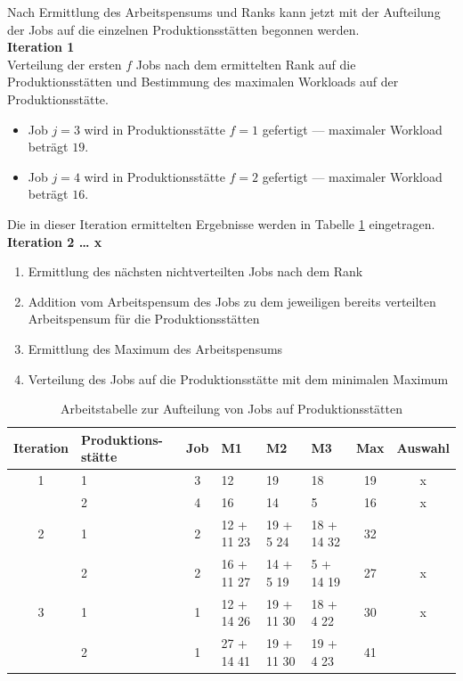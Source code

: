 \documentclass[final, english, ngerman, a4paper, 12pt, %
numbers=noenddot,
cd=true,
cdfont=false,cdfont=nohead,cdfont=nodin,
cdmath=false,
cdhead=false,
cdfoot=true,
cdcover=monochrome,
cdgeometry=symmetric,
declaration=heading,
declaration=notoc,
abstract=heading,
]{tudscrreprt}
\begin{document}
Nach Ermittlung des Arbeitspensums und Ranks kann jetzt mit der Aufteilung der Jobs auf die einzelnen Produktionsstätten begonnen werden.\\

\noindent
\textbf{Iteration 1}\\
\noindent
Verteilung der ersten $f$ Jobs nach dem ermittelten Rank auf die Produktionsstätten und Bestimmung des maximalen Workloads auf der Produktionsstätte.

\begin{itemize}
	\item Job $j=3$ wird in Produktionsstätte $f=1$ gefertigt — maximaler Workload beträgt $19$.
	\item Job $j=4$ wird in Produktionsstätte $f=2$ gefertigt — maximaler Workload beträgt $16$.
\end{itemize}
\noindent
Die in dieser Iteration ermittelten Ergebnisse werden in Tabelle \ref{tab:aufteilung} eingetragen.\\

\noindent
\textbf{Iteration 2 … x}
\begin{enumerate}
	\item Ermittlung des nächsten nichtverteilten Jobs nach dem Rank
	\item Addition vom Arbeitspensum des Jobs zu dem jeweiligen bereits verteilten Arbeitspensum für die Produktionsstätten
	\item Ermittlung des Maximum des Arbeitspensums
	\item Verteilung des Jobs auf die Produktionsstätte mit dem minimalen Maximum
\end{enumerate}

\begin{table}[H]
	\centering
	\begin{tabular}{c p{2.5cm} c p{1.5cm} p{1.5cm} p{1.5cm} c c}
		\toprule
		Iteration & Produktions-stätte & Job & M1          & M2         & M3         & Max & Auswahl \\
		\midrule
		1            & 1                   & 3   & 12          & 19         & 18         & 19      & x       \\
					 & 2                   & 4   & 16          & 14         & 5          & 16      & x       \\
		\midrule
		2           & 1                   & 2   & 12 + 11 23   & 19 + 5 24  & 18 + 14 32 & 32      &         \\
					 & 2                   & 2   & 16 + 11 27  & 14 + 5 19  & 5 + 14 19  & 27      & x      \\
		\midrule
		3			& 1                   & 1   & 12 + 14 26  & 19 + 11 30 & 18 + 4 22  & 30      & x       \\
					 & 2                   & 1   & 27 + 14 41 & 19 + 11 30 & 19 + 4 23  & 41      &        \\
		\bottomrule
	\end{tabular}
	\caption{Arbeitstabelle zur Aufteilung von Jobs auf Produktionsstätten}
	\label{tab:aufteilung}
\end{table}
\end{document}
